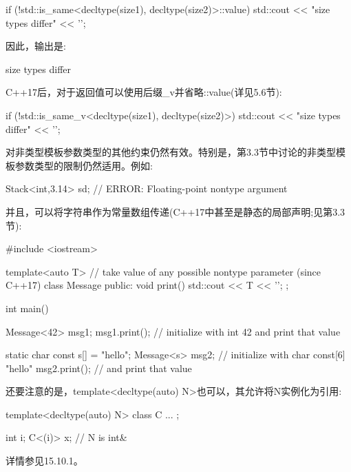 \begin{cpp}
if (!std::is_same<decltype(size1), decltype(size2)>::value) {
	std::cout << "size types differ" << '\n';
}
\end{cpp}

因此，输出是:

\begin{shell}
size types differ
\end{shell}

C++17后，对于返回值可以使用后缀\_v并省略::value(详见5.6节):

\begin{cpp}
if (!std::is_same_v<decltype(size1), decltype(size2)>) {
	std::cout << "size types differ" << '\n';
}
\end{cpp}

对非类型模板参数类型的其他约束仍然有效。特别是，第3.3节中讨论的非类型模板参数类型的限制仍然适用。例如:

\begin{cpp}
Stack<int,3.14> sd; // ERROR: Floating-point nontype argument
\end{cpp}

并且，可以将字符串作为常量数组传递(C++17中甚至是静态的局部声明;见第3.3节):

\begin{cpp}
#include <iostream>

template<auto T> // take value of any possible nontype parameter (since C++17)
class Message {
	public:
	void print() {
		std::cout << T << '\n';
	}
};

int main()
{
	Message<42> msg1;
	msg1.print(); // initialize with int 42 and print that value
	
	static char const s[] = "hello";
	Message<s> msg2; // initialize with char const[6] "hello"
	msg2.print(); // and print that value
}
\end{cpp}

还要注意的是，template<decltype(auto) N>也可以，其允许将N实例化为引用:

\begin{cpp}
template<decltype(auto) N>
class C {
	...
};

int i;
C<(i)> x; // N is int&
\end{cpp}

详情参见15.10.1。




